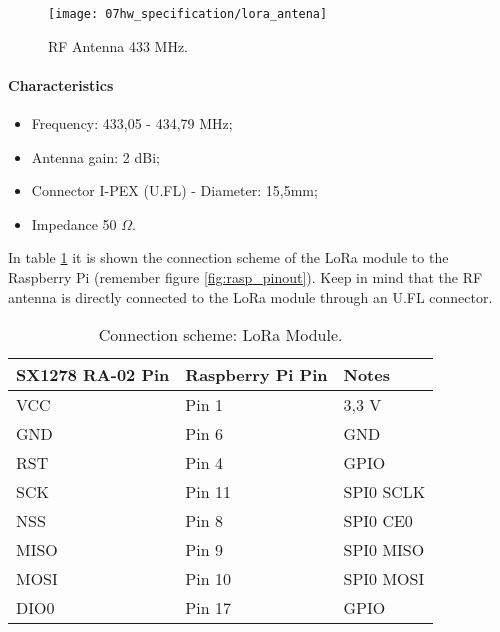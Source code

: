 
\begin{figure}[H]
	\centering
	\texttt{[image: 07hw\_specification/lora\_antena]}
	\caption{RF Antenna 433 MHz.}
	\label{fig:lora_antena}
\end{figure}

\paragraph*{Characteristics}
\begin{itemize}
	\item Frequency: 433,05 - 434,79 MHz;
	\item Antenna gain: 2 dBi;
	\item Connector I-PEX (U.FL) - Diameter: 15,5mm;
	\item Impedance 50 $\Omega$.
\end{itemize}

In table \ref{table:connect_lora} it is shown the connection scheme of the LoRa module to the Raspberry Pi (remember figure \ref{fig:rasp_pinout}). Keep in mind that the RF antenna is directly connected to the LoRa module through an U.FL connector.

\begin{table}[H]
	\centering
	\begin{tabular}{|m{5cm}|m{4cm}|m{3cm}|}
		\hline
		\textbf{SX1278 RA-02 Pin} & \textbf{Raspberry Pi Pin} & \textbf{Notes} 
		\\\hline\hline
		
		VCC & Pin 1 & 3,3 V
		\\\hline
		GND & Pin 6 & GND
		\\\hline
		RST & Pin 4 & GPIO
		\\\hline
		SCK & Pin 11 & SPI0 SCLK
		\\\hline
		NSS & Pin 8 & SPI0 CE0
		\\\hline
		MISO & Pin 9 & SPI0 MISO
		\\\hline
		MOSI & Pin 10 & SPI0 MOSI
		\\\hline
		DIO0 & Pin 17 & GPIO
		\\\hline
	\end{tabular}
	
	\caption{Connection scheme: LoRa Module.}
	\label{table:connect_lora}
\end{table}

